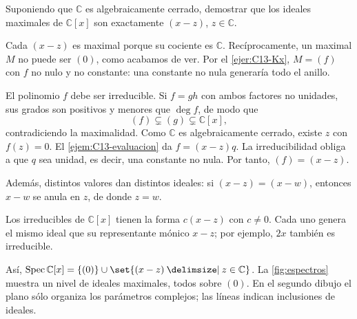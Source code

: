 \begin{ejer}\label{ejer:C13-complejos}
Suponiendo que $\mathbb C$ es algebraicamente cerrado, demostrar que los ideales maximales de $\mathbb C[x]$ son exactamente $(x-z)$, $z\in\mathbb C$.
\end{ejer}
\begin{sol}
Cada $(x-z)$ es maximal porque su cociente es $\mathbb C$. Recíprocamente, un maximal $M$ no puede ser $(0)$, como acabamos de ver. Por el \cref{ejer:C13-Kx}, $M=(f)$ con $f$ no nulo y no constante: una constante no nula generaría todo el anillo.

El polinomio $f$ debe ser irreducible. Si $f=gh$ con ambos factores no unidades, sus grados son positivos y menores que $\deg f$, de modo que
\[
(f)\subsetneq(g)\subsetneq\mathbb C[x],
\]
contradiciendo la maximalidad. Como $\mathbb C$ es algebraicamente cerrado, existe $z$ con $f(z)=0$. El \cref{ejem:C13-evaluacion} da $f=(x-z)q$. La irreducibilidad obliga a que $q$ sea unidad, es decir, una constante no nula. Por tanto, $(f)=(x-z)$.

Además, distintos valores dan distintos ideales: si $(x-z)=(x-w)$, entonces $x-w$ se anula en $z$, de donde $z=w$.
\end{sol}
\begin{obs}
Los irreducibles de $\mathbb C[x]$ tienen la forma $c(x-z)$ con $c\ne0$. Cada uno genera el mismo ideal que su representante mónico $x-z$; por ejemplo, $2x$ también es irreducible.
\end{obs}

Así, $\Spec\mathbb C[x]=\{(0)\}\cup\set{(x-z)\given z\in\mathbb C}$. La \cref{fig:espectros} muestra un nivel de ideales maximales, todos sobre $(0)$. En el segundo dibujo el plano sólo organiza los parámetros complejos; las líneas indican inclusiones de ideales.

